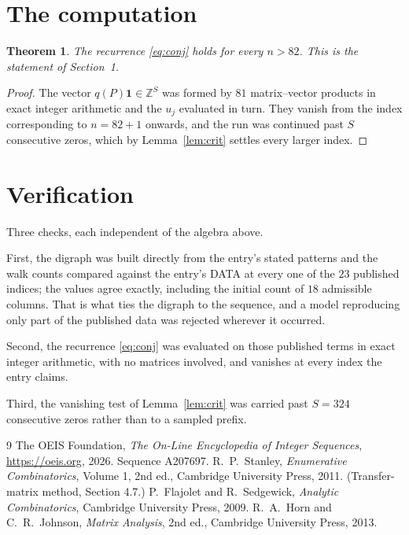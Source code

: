 \documentclass[11pt,a4paper]{article}
\theoremstyle{plain}
\newtheorem{theorem}{Theorem}
\theoremstyle{definition}
\begin{document}
\section{The computation}

\begin{theorem}
The recurrence \eqref{eq:conj} holds for every $n>82$. This is the statement of
Section~1.
\end{theorem}

\begin{proof}
The vector $q(P)\mathbf{1}\in\mathbb{Z}^{S}$ was formed by $81$ matrix--vector
products in exact integer arithmetic and the $u_j$ evaluated in turn. They vanish from the
index corresponding to $n=82+1$ onwards, and the run was continued past $S$ consecutive
zeros, which by Lemma~\ref{lem:crit} settles every larger index.
\end{proof}

\section{Verification}

Three checks, each independent of the algebra above.

First, the digraph was built directly from the entry's stated patterns and the walk counts
compared against the entry's DATA at every one of the $23$ published indices; the
values agree exactly, including the initial count of $18$ admissible columns. That is
what ties the digraph to the sequence, and a model reproducing only part of the published
data was rejected wherever it occurred.

Second, the recurrence \eqref{eq:conj} was evaluated on those published terms in exact
integer arithmetic, with no matrices involved, and vanishes at every index the entry claims.

Third, the vanishing test of Lemma~\ref{lem:crit} was carried past $S=324$ consecutive
zeros rather than to a sampled prefix.

\begin{thebibliography}{9}
 The OEIS Foundation, \emph{The On-Line Encyclopedia of Integer
Sequences}, \url{https://oeis.org}, 2026. Sequence A207697.
 R.~P.~Stanley, \emph{Enumerative Combinatorics}, Volume 1, 2nd ed.,
Cambridge University Press, 2011. (Transfer-matrix method, Section 4.7.)
 P.~Flajolet and R.~Sedgewick, \emph{Analytic Combinatorics}, Cambridge
University Press, 2009.
 R.~A.~Horn and C.~R.~Johnson, \emph{Matrix Analysis}, 2nd ed., Cambridge
University Press, 2013.
\end{thebibliography}
\end{document}

